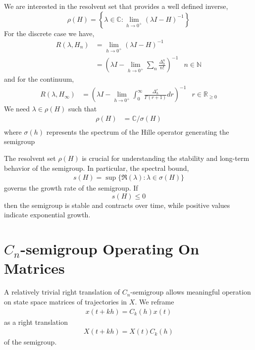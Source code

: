\documentclass{article}
\newcommand{\N}{\mathbb{N}}
\newcommand{\R}{\mathbb{R}}
\newcommand{\C}{\mathbb{C}}
\begin{document}
We are interested in the resolvent set that provides a well defined inverse,
$$
    \rho(H) = \left\{\lambda\in\C: \lim_{h\rightarrow0^+} \left( \lambda I - H \right) ^{-1}\right\}
$$ 
For the discrete case we have,
\begin{align*}
     R(\lambda, H_n) &= \lim_{h\rightarrow0^+}\left( \lambda I - H\right) ^{-1}\\
     &= \left( \lambda I - \lim_{h\rightarrow0^+} \sum_n \frac{\Delta^n_h}{n!}\right) ^{-1} &n\in\N
\end{align*}
and for the continuum,
\begin{align*}
    R(\lambda, H_\infty ) &= \left( \lambda I - \lim_{h\rightarrow0^+} \int_0^\infty \frac{\Delta^r_h}{\Gamma(r+1)} dr\right) ^{-1} &r\in\R_{\geq0}
\end{align*}
We need $\lambda \in \rho(H)$ such that
\begin{align*}
    \rho(H) &=\C /  \sigma\left(H\right)\\
\end{align*}
where $\sigma(h)$ represents the spectrum of the Hille operator generating the semigroup 

The resolvent set $\rho(H)$ is crucial for understanding the stability and long-term behavior of the semigroup. In particular, the spectral bound, 
\begin{align*}
    s(H) = \sup \{\Re(\lambda): \lambda \in \sigma(H) \}
\end{align*}
governs the growth rate of the semigroup. If 
$$
    s(H) \leq 0 
$$
then the semigroup is stable and contracts over time, while positive values indicate exponential growth.

\section{$C_n$-semigroup Operating On Matrices}

A relatively trivial right translation of $C_n$-semigroup allows meaningful operation on state space matrices of trajectories in $X$. We reframe 
\begin{align*}
    x(t+kh) = C_k(h) x(t) 
\end{align*}
as a right translation
\begin{align*}
    X(t+kh) = X(t) C_k(h)
\end{align*}
of the semigroup.
\end{document}
